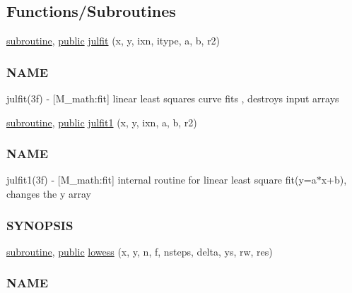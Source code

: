 \subsection*{Functions/\+Subroutines}
\begin{DoxyCompactItemize}
\item 
\hyperlink{M__stopwatch_83_8txt_acfbcff50169d691ff02d4a123ed70482}{subroutine}, \hyperlink{M__stopwatch_83_8txt_a2f74811300c361e53b430611a7d1769f}{public} \hyperlink{namespacem__math_ae78c38ba0be037a58cace0da51c7a8ca}{julfit} (x, y, ixn, itype, a, b, r2)
\begin{DoxyCompactList}\small\item\em \subsubsection*{N\+A\+ME}

julfit(3f) -\/ \mbox{[}M\+\_\+math\+:fit\mbox{]} linear least squares curve fits , destroys input arrays \end{DoxyCompactList}\item 
\hyperlink{M__stopwatch_83_8txt_acfbcff50169d691ff02d4a123ed70482}{subroutine}, \hyperlink{M__stopwatch_83_8txt_a2f74811300c361e53b430611a7d1769f}{public} \hyperlink{namespacem__math_a9a1a7478c87dda7eb126127970f70b7b}{julfit1} (x, y, ixn, a, b, r2)
\begin{DoxyCompactList}\small\item\em \subsubsection*{N\+A\+ME}

julfit1(3f) -\/ \mbox{[}M\+\_\+math\+:fit\mbox{]} internal routine for linear least square fit(y=a$\ast$x+b), changes the y array \subsubsection*{S\+Y\+N\+O\+P\+S\+IS}\end{DoxyCompactList}\item 
\hyperlink{M__stopwatch_83_8txt_acfbcff50169d691ff02d4a123ed70482}{subroutine}, \hyperlink{M__stopwatch_83_8txt_a2f74811300c361e53b430611a7d1769f}{public} \hyperlink{namespacem__math_a8e38b0954bb4c1f27985fb430912f281}{lowess} (x, y, n, f, nsteps, delta, ys, rw, res)
\begin{DoxyCompactList}\small\item\em \subsubsection*{N\+A\+ME}


\end{DoxyCompactList}
\end{DoxyCompactItemize}
